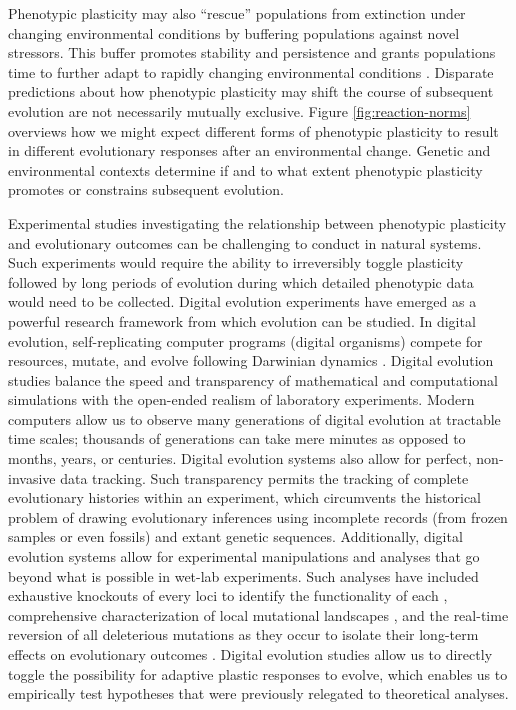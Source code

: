 Phenotypic plasticity may also ``rescue'' populations from extinction under changing environmental conditions by buffering populations against novel stressors.
This buffer promotes stability and persistence and grants populations time to further adapt to rapidly changing environmental conditions \citep{west-eberhard_developmental_2003,chevin_when_2010}. %
Disparate predictions about how phenotypic plasticity may shift the course of subsequent evolution are not necessarily mutually exclusive.
Figure \ref{fig:reaction-norms} overviews how we might expect different forms of phenotypic plasticity to result in different evolutionary responses after an environmental change.
Genetic and environmental contexts determine if and to what extent phenotypic plasticity promotes or constrains subsequent evolution.

Experimental studies investigating the relationship between phenotypic plasticity and evolutionary outcomes can be challenging to conduct in natural systems.
Such experiments would require the ability to irreversibly toggle plasticity followed by long periods of evolution during which detailed phenotypic data would need to be collected.
Digital evolution experiments have emerged as a powerful research framework from which evolution can be studied.
In digital evolution, self-replicating computer programs (digital organisms) compete for resources, mutate, and evolve following Darwinian dynamics  \citep{wilke_biology_2002}.
Digital evolution studies balance the speed and transparency of mathematical and computational simulations with the open-ended realism of laboratory experiments.
Modern computers allow us to observe many generations of digital evolution at tractable time scales; thousands of generations can take mere minutes as opposed to months, years, or centuries.
Digital evolution systems also allow for perfect, non-invasive data tracking.
Such transparency permits the tracking of complete evolutionary histories within an experiment, which circumvents the historical problem of drawing evolutionary inferences using incomplete records (from frozen samples or even fossils) and extant genetic sequences.
Additionally, digital evolution systems allow for experimental manipulations and analyses that go beyond what is possible in wet-lab experiments.
Such analyses have included exhaustive knockouts of every loci to identify the functionality of each \citep{lenski_evolutionary_2003},
comprehensive characterization of local mutational landscapes \citep{lenski_genome_1999,canino-koning_fluctuating_2019},
and the real-time reversion of all deleterious mutations as they occur to isolate their long-term effects on evolutionary outcomes \citep{covert_experiments_2013}. 
Digital evolution studies allow us to directly toggle the possibility for adaptive plastic responses to evolve, which enables us to empirically test hypotheses that were previously relegated to theoretical analyses.


